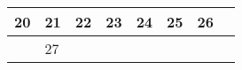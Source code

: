 {\begin{tabularx}{\linewidth}{|l!{\vrule width \myLenLineThicknessThick}*{7}{@{}X@{}|}}
      
      
        \begin{minipage}[t]{6mm}\centering{}20\end{minipage}
      
       & 
    
      
      
        \begin{minipage}[t]{6mm}\centering{}21\end{minipage}
      
       & 
    
      
      
        \begin{minipage}[t]{6mm}\centering{}22\end{minipage}
      
       & 
    
      
      
        \begin{minipage}[t]{6mm}\centering{}23\end{minipage}
      
       & 
    
      
      
        \begin{minipage}[t]{6mm}\centering{}24\end{minipage}
      
       & 
    
      
      
        \begin{minipage}[t]{6mm}\centering{}25\end{minipage}
      
       & 
    
      
      
        \begin{minipage}[t]{6mm}\centering{}26\end{minipage}
      
      
        \\  \hline 
      
    
  
  
  
  \hyperlink{week-2027-52}{} &
    
      
      
        \begin{minipage}[t]{6mm}\centering{}27\end{minipage}
      

\end{tabularx}}
